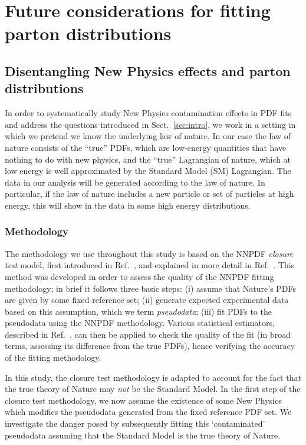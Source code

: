 \documentclass[withindex,glossary]{cam-thesis}
\begin{document}
\newpage
\part{Future considerations for fitting parton distributions}
\chapter{Disentangling New Physics effects and parton distributions}

In order to systematically study New Physics contamination effects in PDF fits and address
the questions introduced in Sect.~\ref{sec:intro}, we work in a setting in which we pretend
we know the underlying law of nature. In our case the law of nature consists of the ``true''
PDFs, which are low-energy quantities that have nothing to do with new physics, and the ``true''
Lagrangian of nature, which at low energy is well approximated by the Standard Model (SM) Lagrangian.
The data in our analysis will be generated according to the law of nature.
In particular, if the law of nature includes a new particle or set of particles at high energy,
this will show in the data in some high energy distributions.

\section{Methodology}
\label{sec:methodology}

The methodology we use throughout this study is based on the NNPDF \textit{closure test} model,
first introduced in Ref.~\cite{NNPDF:2014otw}, and explained in more detail in Ref.~\cite{DelDebbio:2021whr}.
This method was developed
in order to assess the quality of the NNPDF fitting methodology; in brief it follows three basic steps: (i) assume that Nature's PDFs
are given by some fixed reference set; (ii) generate expected experimental data based on this assumption, which we term \textit{pseudodata}; (iii) fit PDFs to the pseudodata using the NNPDF methodology. Various statistical estimators, described in Ref.~\cite{DelDebbio:2021whr}, can then be applied to 
check the quality of the fit (in broad terms, assessing its difference from the true PDFs), hence verifying the accuracy of the fitting methodology.

In this study, the closure test methodology is adapted to account for the fact that the true theory of Nature may \textit{not} be the 
Standard Model. In the first step of the closure test methodology, we now assume the existence of some New Physics which modifies
the pseudodata generated from the fixed reference PDF set. We investigate the danger posed by subsequently fitting this `contaminated' pseudodata assuming that the Standard Model is the true theory of Nature.
\end{document}
